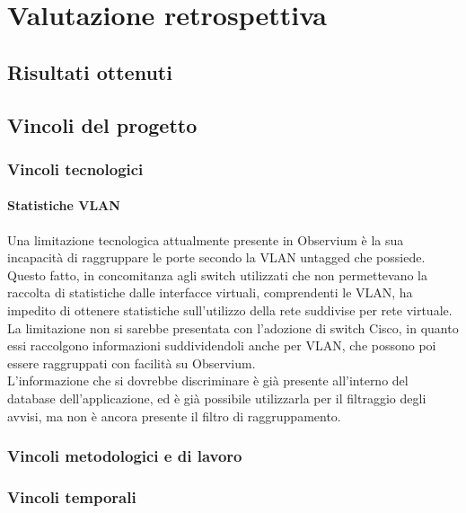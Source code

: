 \documentclass[Tesi.tex]{subfiles}
\begin{document}
\chapter{Valutazione retrospettiva}

\section{Risultati ottenuti}

\section{Vincoli del progetto}
\subsection{Vincoli tecnologici}
\subsubsection{Statistiche VLAN}
Una limitazione tecnologica attualmente presente in Observium è la sua incapacità di raggruppare le porte secondo la VLAN untagged che possiede. \\
Questo fatto, in concomitanza agli switch utilizzati che non permettevano la raccolta di statistiche dalle interfacce virtuali, comprendenti le VLAN, ha impedito di ottenere statistiche sull'utilizzo della rete suddivise per rete virtuale. \\
La limitazione non si sarebbe presentata con l'adozione di switch Cisco, in quanto essi raccolgono informazioni suddividendoli anche per VLAN, che possono poi essere raggruppati con facilità su Observium. \\
L'informazione che si dovrebbe discriminare è già presente all'interno del database dell'applicazione, ed è già possibile utilizzarla per il filtraggio degli avvisi, ma non è ancora presente il filtro di raggruppamento.

\subsection{Vincoli metodologici e di lavoro}

\subsection{Vincoli temporali}
\end{document}

